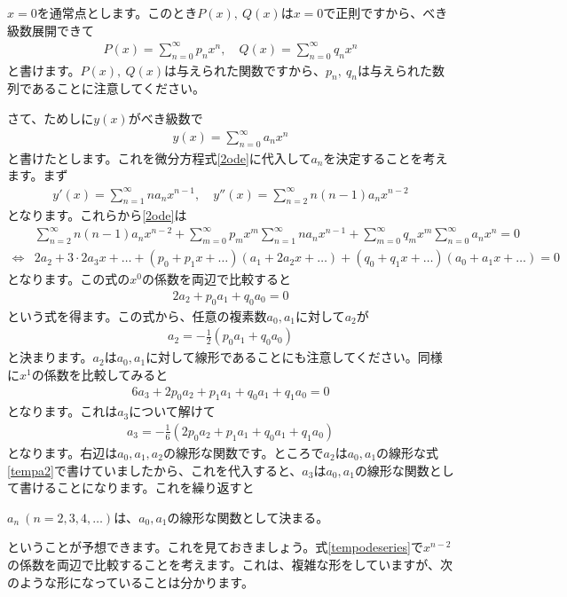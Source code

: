 \documentclass[report,paper=a4, fontsize=12pt, line_length=16cm, number_of_lines=33,dvipdfmx]{jlreq}
\newenvironment{myquote}{\begin{tcolorbox}[
  colback = blue!5, after = \noindent] }{\end{tcolorbox}}
\numberwithin{equation}{section}
\begin{document}
$x=0$を通常点とします。このとき$P(x),\ Q(x)$は$x=0$で正則ですから、べき級数展開できて
\begin{align}
  P(x)=\sum_{n=0}^{\infty}p_{n}x^n,\quad
  Q(x)=\sum_{n=0}^{\infty}q_{n}x^n
\end{align}
と書けます。$P(x),\ Q(x)$は与えられた関数ですから、$p_n,\ q_n$は与えられた数列であることに注意してください。

さて、ためしに$y(x)$がべき級数で
\begin{align}
  y(x)=\sum_{n=0}^{\infty}a_n x^n
\end{align}
と書けたとします。これを微分方程式\eqref{2ode}に代入して$a_n$を決定することを考えます。まず
\begin{align}
  y'(x)=\sum_{n=1}^{\infty} n a_n x^{n-1},\quad
  y''(x)=\sum_{n=2}^{\infty} n(n-1)a_n x^{n-2}
\end{align}
となります。これらから\eqref{2ode}は
\begin{align}
  &\sum_{n=2}^{\infty} n(n-1)a_n x^{n-2}+
  \sum_{m=0}^{\infty}p_{m}x^m\sum_{n=1}^{\infty} n a_n x^{n-1}
  +\sum_{m=0}^{\infty}q_{m}x^m\sum_{n=0}^{\infty}a_n x^n=0\label{tempodeseries}\\
\Leftrightarrow&
2a_2+3\cdot 2 a_3 x+\dots
+(p_0+p_1x+\dots)(a_1+2a_2x+\dots)
+(q_0+q_1x+\dots)(a_0+a_1x+\dots)=0
\end{align}
となります。この式の$x^0$の係数を両辺で比較すると
\begin{align}
  2a_2+p_0a_1+q_0a_0=0
\end{align}
という式を得ます。この式から、任意の複素数$a_0,a_1$に対して$a_2$が
\begin{align}
  a_2=-\frac12(p_0a_1+q_0a_0)\label{tempa2}
\end{align}
と決まります。$a_2$は$a_0,a_1$に対して線形であることにも注意してください。同様に$x^1$の係数を比較してみると
\begin{align}
  6a_3+2p_0a_2+p_1a_1+q_0a_1+q_1a_0=0
\end{align}
となります。これは$a_3$について解けて
\begin{align}
  a_3=-\frac16(2p_0a_2+p_1a_1+q_0a_1+q_1a_0)
\end{align}
となります。右辺は$a_0,a_1,a_2$の線形な関数です。ところで$a_2$は$a_0,a_1$の線形な式\eqref{tempa2}で書けていましたから、これを代入すると、$a_3$は$a_0,a_1$の線形な関数として書けることになります。これを繰り返すと
\begin{myquote}
  $a_n\ (n=2,3,4,\dots)$は、$a_0,a_1$の線形な関数として決まる。
\end{myquote}
ということが予想できます。これを見ておきましょう。式\eqref{tempodeseries}で$x^{n-2}$の係数を両辺で比較することを考えます。これは、複雑な形をしていますが、次のような形になっていることは分かります。
\end{document}
